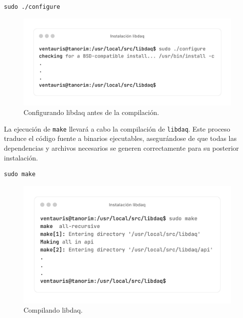 \documentclass[11pt,a4paper,twoside]{report}
\begin{document}
\begin{lstlisting}[style=commandstyle, caption={Configurando libdaq antes de la compilación}]
	sudo ./configure
\end{lstlisting}

\begin{figure}[H]
	\centering
	\includegraphics[scale=0.12]{instalacion_snort/11-11.png}
	\caption{Configurando libdaq antes de la compilación.}
\end{figure}

La ejecución de \texttt{make} llevará a cabo la compilación de \texttt{libdaq}. Este proceso traduce el código fuente a binarios ejecutables, asegurándose de que todas las dependencias y archivos necesarios se generen correctamente para su posterior instalación.

\begin{lstlisting}[style=commandstyle, caption={Compilando libdaq}]
	sudo make
\end{lstlisting}

\begin{figure}[H]
	\centering
	\includegraphics[scale=0.12]{instalacion_snort/12-12.png}
	\caption{Compilando libdaq.}
\end{figure}

\newpage
\end{document}
